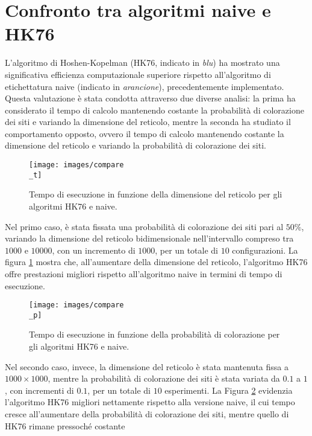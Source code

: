 \section{Confronto tra algoritmi naive e HK76}

L'algoritmo di Hoshen-Kopelman (HK76, indicato in \textit{blu}) ha mostrato una significativa efficienza computazionale superiore rispetto all'algoritmo di etichettatura naive (indicato in \textit{arancione}), precedentemente implementato. Questa valutazione è stata condotta attraverso due diverse analisi: la prima ha considerato il tempo di calcolo mantenendo costante la probabilità di colorazione dei siti e variando la dimensione del reticolo, mentre la seconda ha studiato il comportamento opposto, ovvero il tempo di calcolo mantenendo costante la dimensione del reticolo e variando la probabilità di colorazione dei siti.
\begin{figure}[H]
	\centering
	\texttt{[image: images/compare\\\_t]}
	\caption{Tempo di esecuzione in funzione della dimensione del reticolo per gli algoritmi HK76 e naive.}
	\label{fig:comparet}
\end{figure}
\noindent
Nel primo caso, è stata fissata una probabilità di colorazione dei siti pari al $50\%$, variando la dimensione del reticolo bidimensionale nell'intervallo compreso tra $1000$ e $10000$, con un incremento di $1000$, per un totale di $10$ configurazioni. La figura \ref{fig:comparet} mostra che, all'aumentare della dimensione del reticolo, l'algoritmo HK76 offre prestazioni migliori rispetto all'algoritmo naive in termini di tempo di esecuzione.

\begin{figure}[H]
	\centering
	\texttt{[image: images/compare\\\_p]}
	\caption{Tempo di esecuzione in funzione della probabilità di colorazione per gli algoritmi HK76 e naive.}
	\label{fig:comparep}
\end{figure}

\noindent
Nel secondo caso, invece, la dimensione del reticolo è stata mantenuta fissa a $1000\times1000$, mentre la probabilità di colorazione dei siti è stata variata da $0.1$ a $1$, con incrementi di $0.1$, per un totale di $10$ esperimenti. La Figura \ref{fig:comparep} evidenzia l'algoritmo HK76 migliori nettamente rispetto alla versione naive, il cui tempo cresce all'aumentare della probabilità di colorazione dei siti, mentre quello di HK76 rimane pressoché costante


